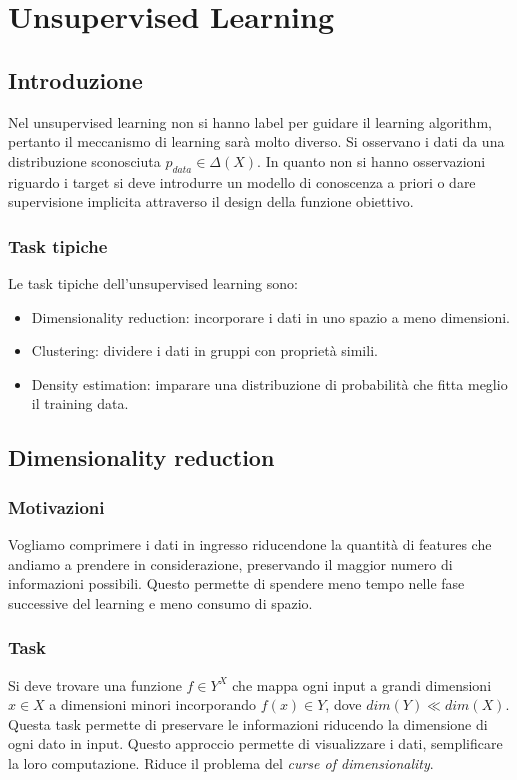 \chapter{Unsupervised Learning}

\section{Introduzione}
Nel unsupervised learning non si hanno label per guidare il learning algorithm, pertanto il meccanismo di learning sar\`a molto diverso.
Si osservano i dati da una distribuzione sconosciuta $p_{data}\in\Delta(X)$.
In quanto non si hanno osservazioni riguardo i target si deve introdurre un modello di conoscenza a priori o dare supervisione implicita attraverso il design della funzione obiettivo.

	\subsection{Task tipiche}
	Le task tipiche dell'unsupervised learning sono:
	\begin{itemize}
		\item Dimensionality reduction: incorporare i dati in uno spazio a meno dimensioni.
		\item Clustering: dividere i dati in gruppi con propriet\`a simili.
		\item Density estimation: imparare una distribuzione di probabilit\`a che fitta meglio il training data.
	\end{itemize}
	
	\section{Dimensionality reduction}
	\subsection{Motivazioni}
	Vogliamo comprimere i dati in ingresso riducendone la quantit\`a di features che andiamo a prendere in considerazione, preservando il maggior numero di informazioni possibili. 
	Questo permette di spendere meno tempo nelle fase successive del learning e meno consumo di spazio.
	\subsection{Task}
	Si deve trovare una funzione $f\in Y^X$ che mappa ogni input a grandi dimensioni $x\in X$ a dimensioni minori incorporando $f(x)\in Y$, dove $dim(Y)\ll dim(X)$.
	Questa task permette di preservare le informazioni riducendo la dimensione di ogni dato in input.
	Questo approccio permette di visualizzare i dati, semplificare la loro computazione.
	Riduce il problema del \emph{curse of dimensionality}.

